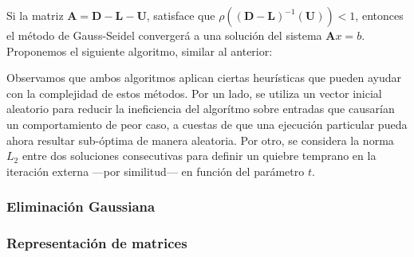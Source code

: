 \vspace{1em}
Si la matriz $\mathbf{A} = \mathbf{D} - \mathbf{L} - \mathbf{U}$, satisface que $\rho((\mathbf{D} - \mathbf{L})^{-1}(\mathbf{U})) < 1$, entonces el método de Gauss-Seidel convergerá a una solución del sistema $\mathbf{A}x = b$. Proponemos el siguiente algoritmo, similar al anterior:

\vspace{1em}


\vspace{1em}
Observamos que ambos algoritmos aplican ciertas heurísticas que pueden ayudar con la complejidad de estos métodos. Por un lado, se utiliza un vector inicial aleatorio para reducir la ineficiencia del algorítmo sobre entradas que causarían un comportamiento de peor caso, a cuestas de que una ejecución particular pueda ahora resultar sub-óptima de manera aleatoria. Por otro, se considera la norma $L_2$ entre dos soluciones consecutivas para definir un quiebre temprano en la iteración externa ---por similitud--- en función del parámetro $t$.




\vspace{2em}
\subsubsection{Eliminación Gaussiana}




\subsubsection{Representación de matrices}
